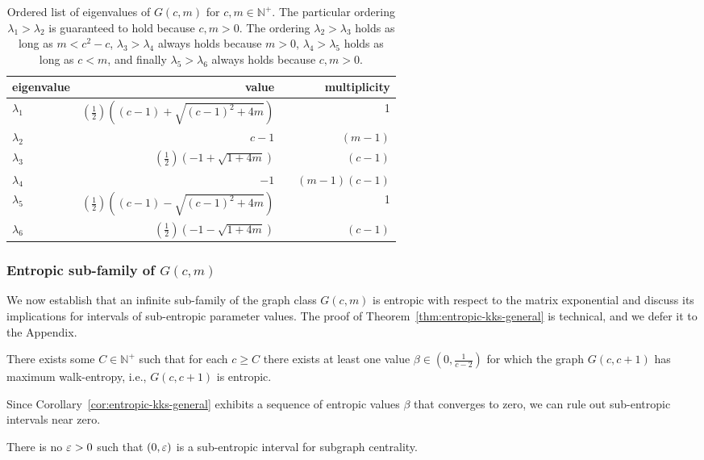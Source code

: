 \begin{table}
    \centering
    \begin{tabularx}{0.80\textwidth}{lrXr}
      eigenvalue & value & & multiplicity \\
      \toprule
      $\lambda_1$  &  $\left(\tfrac{1}{2}\right)\left( (c-1) + \sqrt{(c-1)^2 + 4m} \right)$ & & 1 \\
      $\lambda_2$  &  $c-1$  &  & $(m-1)$  \\
      $\lambda_3$  &  $\left(\tfrac{1}{2}\right)\left( -1 + \sqrt{1 + 4m} \right)$  &  & $(c-1)$  \\
      $\lambda_4$  &  $-1$  &  & $(m-1)(c-1)$  \\
      $\lambda_5$  &  $\left(\tfrac{1}{2}\right)\left( (c-1) - \sqrt{(c-1)^2 + 4m} \right)$  &  & 1  \\
      $\lambda_6$  &  $\left(\tfrac{1}{2}\right)\left( -1 - \sqrt{1 + 4m} \right)$  &  & $(c-1)$    \\
    \end{tabularx}
    \caption{\label{tab:eigenvalues}
        Ordered list of eigenvalues of $G(c,m)$ for $c, m \in \mathbb{N}^+$.
        The particular ordering
        $\lambda_1 > \lambda_2$ is guaranteed to hold because $c, m > 0$.
        The ordering $\lambda_2 > \lambda_3$ holds as long as $m < c^2 - c$,
        $\lambda_3 > \lambda_4$ always holds because $m > 0$,
        $\lambda_4 > \lambda_5$ holds as long as $c < m$,
        and finally $\lambda_5 > \lambda_6$ always holds because $c,m > 0$.
    }
\end{table}

\subsubsection*{Entropic sub-family of $G(c,m)$}

We now establish that an infinite sub-family of the graph class $G(c,m)$ is
entropic with respect to the matrix exponential and discuss its implications for
intervals of sub-entropic parameter values.
The proof of Theorem~\ref{thm:entropic-kks-general} is technical, and we defer it to the Appendix.

\begin{theorem}\label{thm:entropic-kks-general}
    
\end{theorem}
\begin{corollary}\label{cor:entropic-kks-general}
  There exists some $C \in \mathbb{N}^+$ such that for each $c \geq C$
  there exists at least one value $\beta \in (0, \tfrac{1}{c-2})$ for which the graph $G(c,c+1)$ has maximum walk-entropy, i.e., $G(c,c+1)$ is entropic.
\end{corollary}

Since Corollary~\ref{cor:entropic-kks-general} exhibits a sequence of entropic values $\beta$ that converges to zero, we can rule out sub-entropic intervals near zero.
\begin{corollary}
    There is no $\varepsilon > 0$ such that $(0,\varepsilon)$ is a sub-entropic interval for subgraph centrality.
\end{corollary}
